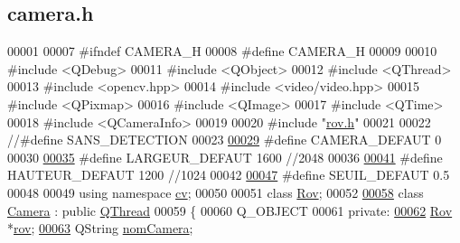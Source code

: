 \hypertarget{camera_8h_source}{}\subsection{camera.\+h}
\label{camera_8h_source}

\begin{DoxyCode}
00001 
00007 \textcolor{preprocessor}{#ifndef CAMERA\_H}
00008 \textcolor{preprocessor}{#define CAMERA\_H}
00009 
00010 \textcolor{preprocessor}{#include <QDebug>}
00011 \textcolor{preprocessor}{#include <QObject>}
00012 \textcolor{preprocessor}{#include <QThread>}
00013 \textcolor{preprocessor}{#include <opencv.hpp>}
00014 \textcolor{preprocessor}{#include <video/video.hpp>}
00015 \textcolor{preprocessor}{#include <QPixmap>}
00016 \textcolor{preprocessor}{#include <QImage>}
00017 \textcolor{preprocessor}{#include <QTime>}
00018 \textcolor{preprocessor}{#include <QCameraInfo>}
00019 
00020 \textcolor{preprocessor}{#include "\hyperlink{rov_8h}{rov.h}"}
00021 
00022 \textcolor{comment}{//#define SANS\_DETECTION}
00023 
\hyperlink{camera_8h_a87f76384d33bc9bba579afd1d5f3221a}{00029} \textcolor{preprocessor}{#define CAMERA\_DEFAUT       0}
00030 
\hyperlink{camera_8h_afe66edd1ec0aa05058aaa2a069248f65}{00035} \textcolor{preprocessor}{#define LARGEUR\_DEFAUT      1600 //2048}
00036 
\hyperlink{camera_8h_a70cf269dc21e5a921c2927034d6cadd2}{00041} \textcolor{preprocessor}{#define HAUTEUR\_DEFAUT      1200 //1024}
00042 
\hyperlink{camera_8h_ae340bfbdd3eec3bbbea7d39d91c8aa91}{00047} \textcolor{preprocessor}{#define SEUIL\_DEFAUT        0.5}
00048 
00049 \textcolor{keyword}{using namespace }\hyperlink{namespacecv}{cv};
00050 
00051 \textcolor{keyword}{class }\hyperlink{class_rov}{Rov};
00052 
\hyperlink{class_camera}{00058} \textcolor{keyword}{class }\hyperlink{class_camera}{Camera} : \textcolor{keyword}{public} \hyperlink{class_q_thread}{QThread}
00059 \{
00060     Q\_OBJECT
00061 \textcolor{keyword}{private}:
\hyperlink{class_camera_ad1dde4d981877001281af01c392307f1}{00062}     \hyperlink{class_rov}{Rov} *\hyperlink{class_camera_ad1dde4d981877001281af01c392307f1}{rov};                            
\hyperlink{class_camera_ac1cdaf82921d2a2f3f941d867718eba2}{00063}     QString \hyperlink{class_camera_ac1cdaf82921d2a2f3f941d867718eba2}{nomCamera};                   

\end{DoxyCode}

